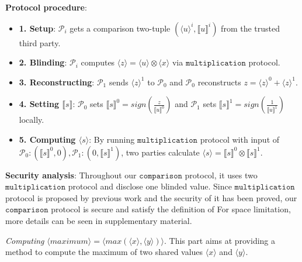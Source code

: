 \documentclass[letterpaper]{article} %
\begin{document}
       \textbf{Protocol procedure}:
       \begin{itemize}
           \item \textbf{1. Setup}: $\mathcal{P}_{i}$ gets a comparison two-tuple $(\langle u\rangle ^{i},\llbracket u \rrbracket ^{i})$ from the trusted third party.

           \item \textbf{2. Blinding}:
           $\mathcal{P}_{i}$ computes $\langle z\rangle = \langle u\rangle \otimes \langle x\rangle $ via $\mathtt{multiplication}$ protocol.


           \item \textbf{3. Reconstructing}:
           $\mathcal{P}_{1}$ sends $\langle z\rangle ^{1}$ to $\mathcal{P}_{0}$ and
           $\mathcal{P}_{0}$ reconstructs
           $z = \langle z\rangle ^{0}+\langle z\rangle ^{1}$.



           \item \textbf{4. Setting $\llbracket s \rrbracket$}:
           $\mathcal{P}_{0}$ sets $\llbracket s \rrbracket^{0}
           =sign(\frac{z}{\llbracket u \rrbracket^{0}})$
           and $\mathcal{P}_{1}$ sets $\llbracket s \rrbracket^{1}
           =sign(\frac{1}{\llbracket u \rrbracket^{1}})$ locally.

           \item \textbf{5. Computing $\langle s\rangle$}:
           By running $\mathtt{multiplication}$ protocol with input of
           $\mathcal{P}_{0}:(\llbracket s \rrbracket ^{0},0),\mathcal{P}_{1}:(0,\llbracket s \rrbracket ^{1})$,
           two parties calculate  $\langle s\rangle = \llbracket s \rrbracket ^{0}\otimes \llbracket s \rrbracket ^{1}$.

       \end{itemize}
       \textbf{Security analysis}:
       Throughout our $\mathtt{comparison}$ protocol,
       it uses two $\mathtt{multiplication}$ protocol and disclose one blinded value.
       Since $\mathtt{multiplication}$ protocol is proposed by previous work
       and the security of it has been proved, our $\mathtt{comparison}$ protocol is secure
       and satisfy the definition of
       For space limitation, more details can be seen in supplementary material.



       \emph{Computing} $ \langle maximum\rangle  = \langle max(\langle x\rangle,\langle y\rangle)\rangle $.
       This part aims at providing a method to compute the maximum of two shared values $\langle x \rangle$ and $\langle y \rangle$.
\end{document}
